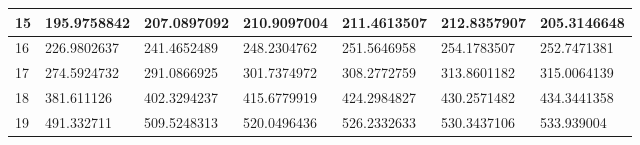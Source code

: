 \documentclass[11pt, letterpaper]{article}
\begin{document}
\begin{appendices}
\begin{table}[!hpt]
\begin{tabular}{|l|l|l|l|l|l|l|}
        15 & 195.9758842 & 207.0897092 & 210.9097004 & 211.4613507 & 212.8357907 & 205.3146648 \\ \hline
        16 & 226.9802637 & 241.4652489 & 248.2304762 & 251.5646958 & 254.1783507 & 252.7471381 \\ \hline
        17 & 274.5924732 & 291.0866925 & 301.7374972 & 308.2772759 & 313.8601182 & 315.0064139 \\ \hline
        18 & 381.611126 & 402.3294237 & 415.6779919 & 424.2984827 & 430.2571482 & 434.3441358 \\ \hline
        19 & 491.332711 & 509.5248313 & 520.0496436 & 526.2332633 & 530.3437106 & 533.939004 \\ \hline
    \end{tabular}
\end{table}


\end{appendices}
\end{document}
